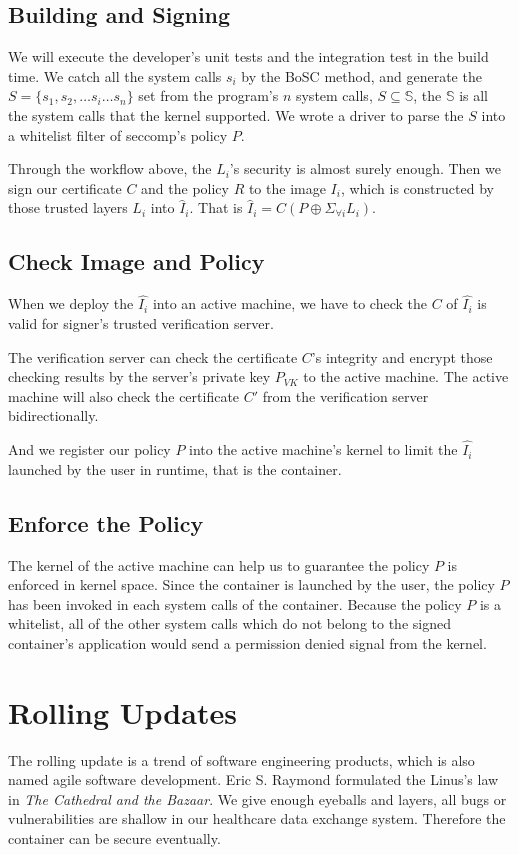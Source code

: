 \subsection{Building and Signing}

We will execute the developer's unit tests and the integration test in the build time.
We catch all the system calls $s_i$ by the BoSC\cite{1495942} method,
and generate the $S = \{s_1, s_2, \dots s_i \dots s_n\}$ set from the
program's $n$ system calls, $S \subseteq \mathbb{S}$, the $\mathbb{S}$ is all the system
calls that the kernel supported.  We wrote a driver to parse the $S$ into
a whitelist filter of seccomp's policy $P$.

Through the workflow above, the $L_i$'s security is almost surely enough.
Then we sign our certificate $C$ and the policy $R$ to the image $I_i$, which
is constructed by those trusted layers $L_i$ into $\hat I_{i}$. That is
$\hat I_{i} = C(P \oplus \Sigma_{\forall i} L_i)$.


\subsection{Check Image and Policy}
When we deploy the $\hat{I_i}$ into an active machine, we have to check the $C$ of
$\hat{I_i}$ is valid for signer's trusted verification server.

The verification server can check the certificate $C$'s integrity and encrypt those
checking results by the server's private key $P_{VK}$ to the active machine. The active
machine will also check the certificate $C'$ from the verification server bidirectionally.

And we register our policy $P$ into the active machine's kernel to limit the $\hat{I_i}$
launched by the user in runtime, that is the container.

\subsection{Enforce the Policy}

The kernel of the active machine can help us to guarantee the policy $P$ is enforced in
kernel space. Since the container is launched by the user, the policy $P$
has been invoked in each system calls of the container. Because the policy $P$ is a whitelist,
all of the other system calls which do not belong to the signed container's application
would send a permission denied signal from the kernel.

\section{Rolling Updates}

The rolling update is a trend of software engineering products, which is
also named agile software development. Eric S. Raymond formulated
the Linus's law in \emph{The Cathedral and the Bazaar}\cite{9780596001087}.
We give enough eyeballs and layers, all bugs or vulnerabilities are shallow in our
healthcare data exchange system. Therefore the container can be secure eventually.

